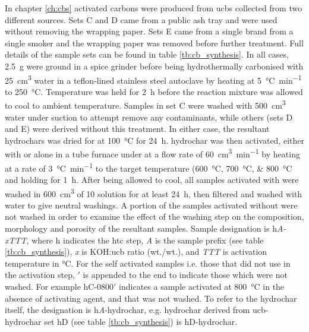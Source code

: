 In chapter \ref{ch:cbs} activated carbons were produced from \glspl{ucb} collected from two different sources. Sets C and D came from a public ash tray and were used without removing the wrapping paper. Sets E came from a single brand from a single smoker and the wrapping paper was removed before further treatment. Full details of the sample sets can be found in table \ref{tb:cb_synthesis}. In all cases, \qty{2.5}{\gram}  were ground in a spice grinder before being hydrothermally carbonised with \qty{25}{\cm\cubed} water in a teflon-lined stainless steel autoclave by heating at \qty{5}{\degreeCelsius\per\minute} to \qty{250}{\degreeCelsius}. Temperature was held for \qty{2}{\hour} before the reaction mixture was allowed to cool to ambient temperature. Samples in set C were washed with \qty{500}{\cm\cubed} water under suction to attempt remove any contaminants, while others (sets D and E) were derived without this treatment. In either case, the resultant \glspl{hydrochar} was dried for at \qty{100}{\degreeCelsius} for \qty{24}{\hour}. \Gls{hydrochar} was then activated, either with  or alone in a tube furnace under  at a flow rate of \qty{60}{\cm\cubed\per\minute} by heating at a rate of \qty{3}{\degreeCelsius\per\minute} to the target temperature (\qtylist[list-units=single, list-final-separator={ or }]{600;700;800}{\degreeCelsius} and holding for \qty{1}{\hour}. After being allowed to cool, all samples activated with  were washed in \qty{600}{\cm\cubed} of \qty{10}{\volpercent}  solution for at least \qty{24}{\hour}, then filtered and washed with water to give neutral washings. A portion of the samples activated without  were not washed in order to examine the effect of the washing step on the composition, morphology and porosity of the resultant samples. Sample designation is h\textit{A-xTTT}, where h indicates the \gls{htc} step, \textit{A} is the sample prefix (see table \ref{tb:cb_synthesis}), \textit{x} is KOH:\acrshort{ucb} ratio (wt./wt.), and \textit{TTT} is activation temperature in \unit{\degreeCelsius}. For the self activated samples i.e. those that did not use  in the activation step, $'$ is appended to the end to indicate those which were not washed. For example hC-0800$'$ indicates a sample activated at \qty{800}{\degreeCelsius} in the absence of \gls{activating agent}, and that was not washed. To refer to the \gls{hydrochar} itself, the designation is h\textit{A}-hydrochar, e.g. \gls{hydrochar} derived from \acrshort{ucb}-\gls{hydrochar} set hD (see table \ref{tb:cb_synthesis}) is hD-hydrochar.

